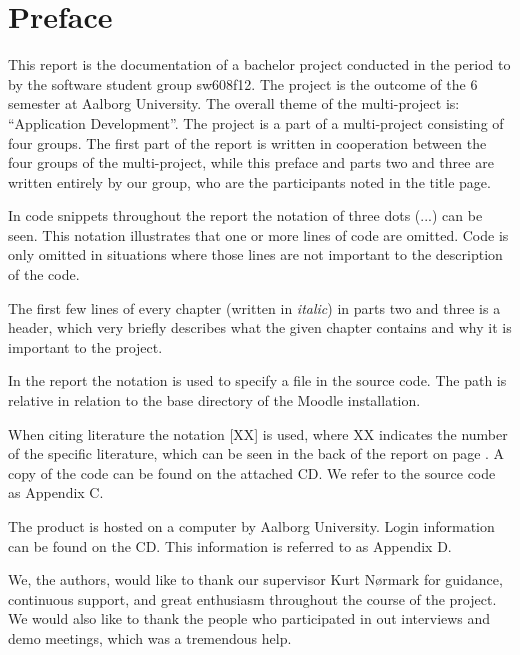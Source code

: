 \chapter*{Preface}
\label{chap:preface}
This report is the documentation of a bachelor project conducted in the period  to  by the software student group sw608f12.
The project is the outcome of the 6\ths{} semester at Aalborg University. 
The overall theme of the multi-project is: ``Application Development''. 
The project is a part of a multi-project consisting of four groups. 
The first part of the report is written in cooperation between the four groups of the multi-project, while this preface and parts two and three are written entirely by our group, who are the participants noted in the title page.

In code snippets throughout the report the notation of three dots (...)  can be seen.
This notation illustrates that one or more lines of code are omitted. 
Code is only omitted in situations where those lines are not important to the description of the code. 

The first few lines of every chapter (written in \textit{italic}) in parts two and three is a header, which very briefly describes what the given chapter contains and why it is important to the project.

In the report the notation  is used to specify a file in the source code. 
The path is relative in relation to the base directory of the Moodle installation. 

When citing literature the notation [XX] is used, where XX indicates the number of the specific literature, which can be seen in the back of the report on page \pageref{chap:bib}.
A copy of the code can be found on the attached CD. 
We refer to the source code as Appendix C.

The product is hosted on a computer by Aalborg University. 
Login information can be found on the CD.
This information is referred to as Appendix D.

We, the authors, would like to thank our supervisor Kurt N\o{}rmark for guidance, continuous support, and great enthusiasm throughout the course of the project.
We would also like to thank the people who participated in out interviews and demo meetings, which was a tremendous help.